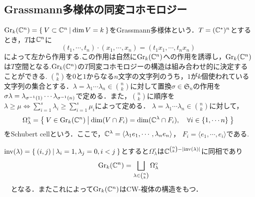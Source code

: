 \subsection{Grassmann多様体の同変コホモロジー}
$\text{Gr}_k(\mathbb{C}^n)=\left\{\:V\subset \mathbb{C}^n\:\middle|\:\dim V = k\:\right\}$をGrassmann多様体という．$T=(\mathbb{C}^*)^n$とするとき，$T$は$\mathbb{C}^n$に
\[
(t_1,\cdots,t_n)\cdot(x_1,\cdots,x_n)=(t_1x_1,\cdots,t_nx_n)
\]
によって左から作用する.この作用は自然に$\text{Gr}_k(\mathbb{C}^n)$への作用を誘導し，$\text{Gr}_k(\mathbb{C}^n)$は$T$空間となる.$\text{Gr}_k(\mathbb{C}^n)$の$T$同変コホモロジーの構造は組み合わせ的に決定することができる.
$\binom{n}{k}$を$0$と$1$からなる$n$文字の文字列のうち，$1$が$k$個使われている文字列の集合とする．$\lambda=\lambda_1\cdots \lambda_n\in\binom{n}{k}$に対して置換$\sigma\in\mathfrak{S}_n$の作用を$\sigma\lambda=\lambda_{\sigma^{-1}(1)}\cdots\lambda_{\sigma^{-1}(n)}$で定める．また，$\binom{n}{k}$に順序を$\lambda\geq\mu\Leftrightarrow \sum_{i=1}^s\lambda_i\geq\sum_{i=1}^s\mu_i$によって定める．
$\lambda=\lambda_1\cdots \lambda_n\in\binom{n}{k}$に対して，
\[
\Omega_\lambda^\circ=\left\{\:V\in \text{Gr}_k(\mathbb{C}^n)\:\middle|\:\dim(V\cap F_i)= \dim(\mathbb{C}^{\lambda}\cap F_i),\quad \forall i\in \{1,\cdots n\}\:\right\}
\]
をSchubert cellという．ここで，$\mathbb{C}^{\lambda}=\langle\lambda_{1}e_{1},\cdots,\lambda_ne_n\rangle$， $F_i=\langle e_{1},\cdots,e_i\rangle$である. 

\begin{prop}
  $\text{inv}(\lambda)=\left\{\:(i,j)\:\middle|\:\lambda_i=1, \lambda_j=0, i<j\:\right\}$とすると$\Omega_\lambda^\circ$は$\mathbb{C}^{\binom{n}{k}-|\text{inv}(\lambda)|}$に同相であり
\begin{equation}\label{CW str of grassmannian}
\text{Gr}_k(\mathbb{C}^n)=\bigsqcup_{\lambda\in\binom{n}{k}}\Omega_\lambda^\circ
\end{equation}
　となる．またこれによって$\text{Gr}_k(\mathbb{C}^n)$はCW-複体の構造をもつ．
\end{prop}

